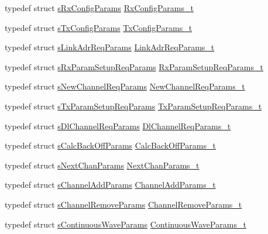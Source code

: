 \begin{DoxyCompactItemize}
\item 
typedef struct \mbox{\hyperlink{structs_rx_config_params}{s\+Rx\+Config\+Params}} \mbox{\hyperlink{group___r_e_g_i_o_n_ga375c038078dfcfc7ef14280021db719e}{Rx\+Config\+Params\+\_\+t}}
\item 
typedef struct \mbox{\hyperlink{structs_tx_config_params}{s\+Tx\+Config\+Params}} \mbox{\hyperlink{group___r_e_g_i_o_n_gabed730d4d04b0b60d4b6d1966d3f21d3}{Tx\+Config\+Params\+\_\+t}}
\item 
typedef struct \mbox{\hyperlink{structs_link_adr_req_params}{s\+Link\+Adr\+Req\+Params}} \mbox{\hyperlink{group___r_e_g_i_o_n_gad4af503e8d4de1846129e26a799a1e8e}{Link\+Adr\+Req\+Params\+\_\+t}}
\item 
typedef struct \mbox{\hyperlink{structs_rx_param_setup_req_params}{s\+Rx\+Param\+Setup\+Req\+Params}} \mbox{\hyperlink{group___r_e_g_i_o_n_ga7165f282c670c728c36d534df2285157}{Rx\+Param\+Setup\+Req\+Params\+\_\+t}}
\item 
typedef struct \mbox{\hyperlink{structs_new_channel_req_params}{s\+New\+Channel\+Req\+Params}} \mbox{\hyperlink{group___r_e_g_i_o_n_gae2abcdb6dbb843c9faf5fd3009eca9d6}{New\+Channel\+Req\+Params\+\_\+t}}
\item 
typedef struct \mbox{\hyperlink{structs_tx_param_setup_req_params}{s\+Tx\+Param\+Setup\+Req\+Params}} \mbox{\hyperlink{group___r_e_g_i_o_n_ga26836ef2996e70410e42ef471073f855}{Tx\+Param\+Setup\+Req\+Params\+\_\+t}}
\item 
typedef struct \mbox{\hyperlink{structs_dl_channel_req_params}{s\+Dl\+Channel\+Req\+Params}} \mbox{\hyperlink{group___r_e_g_i_o_n_gae0d608ff1f8ea0a430e4f9a4c38ec7f3}{Dl\+Channel\+Req\+Params\+\_\+t}}
\item 
typedef struct \mbox{\hyperlink{structs_calc_back_off_params}{s\+Calc\+Back\+Off\+Params}} \mbox{\hyperlink{group___r_e_g_i_o_n_ga7c5c9a8da174e6679eded8257dc92fd9}{Calc\+Back\+Off\+Params\+\_\+t}}
\item 
typedef struct \mbox{\hyperlink{structs_next_chan_params}{s\+Next\+Chan\+Params}} \mbox{\hyperlink{group___r_e_g_i_o_n_ga115f5e83afae352c0a3dcdc193374040}{Next\+Chan\+Params\+\_\+t}}
\item 
typedef struct \mbox{\hyperlink{structs_channel_add_params}{s\+Channel\+Add\+Params}} \mbox{\hyperlink{group___r_e_g_i_o_n_gab1c5f3aa06614283202906cef4417860}{Channel\+Add\+Params\+\_\+t}}
\item 
typedef struct \mbox{\hyperlink{structs_channel_remove_params}{s\+Channel\+Remove\+Params}} \mbox{\hyperlink{group___r_e_g_i_o_n_gaa37468560d2fc81a977b57a48e5d72c0}{Channel\+Remove\+Params\+\_\+t}}
\item 
typedef struct \mbox{\hyperlink{structs_continuous_wave_params}{s\+Continuous\+Wave\+Params}} \mbox{\hyperlink{group___r_e_g_i_o_n_gaf39bb5ba06921139c6d17f88a8d518cd}{Continuous\+Wave\+Params\+\_\+t}}
\end{DoxyCompactItemize}
